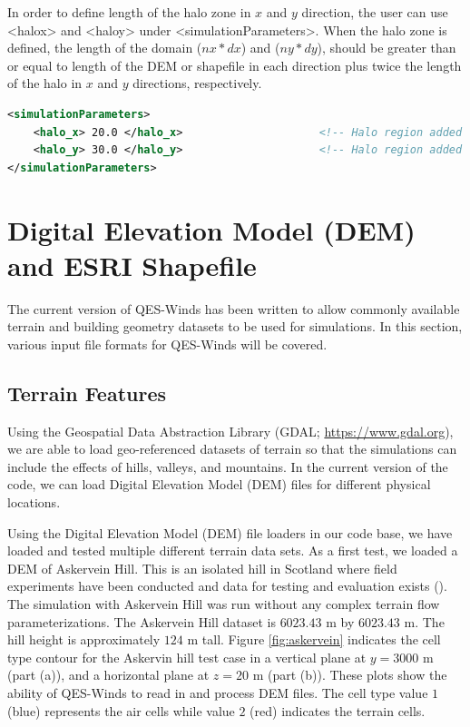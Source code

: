 In order to define length of the halo zone in $x$ and $y$ direction, the user can use <halo\textunderscore x> and <halo\textunderscore y> under <simulationParameters>. When the halo zone is defined, the length of the domain ($nx*dx$) and ($ny*dy$), should be greater than or equal to length of the DEM or shapefile in each direction plus twice the length of the halo in $x$ and $y$ directions, respectively.

\begin{lstlisting}[language=XML]
<simulationParameters>
  	<halo_x> 20.0 </halo_x>						<!-- Halo region added to x-direction of domain (at the beginning and the end of domain) (meters)-->
  	<halo_y> 30.0 </halo_y>						<!-- Halo region added to y-direction of domain (at the beginning and the end of domain) (meters)-->
</simulationParameters>
\end{lstlisting}

\section{Digital Elevation Model (DEM) and ESRI Shapefile}

The current version of QES-Winds has been written to allow commonly available terrain and building geometry datasets to be used for simulations. In this section, various input file formats for QES-Winds will be covered.

\subsection{Terrain Features}

Using the Geospatial Data Abstraction Library (GDAL; \href{https://www.gdal.org}{https://www.gdal.org}), we are able to load geo-referenced datasets of terrain so that the simulations can include the effects of hills, valleys, and mountains. In the current version of the code, we can load Digital Elevation Model (DEM) files for different physical locations.

Using the Digital Elevation Model (DEM) file loaders in our code base, we have loaded and tested multiple different terrain data sets. As a first test, we loaded a DEM of Askervein Hill. This is an isolated hill in Scotland where field experiments have been conducted and data for testing and evaluation exists (\cite{taylor1987askervein,mickle1988askervein}). The simulation with Askervein Hill was run without any complex terrain flow parameterizations. The Askervein Hill dataset is $6023.43$ m by $6023.43$ m. The hill height is approximately $124$ m tall. Figure \ref{fig:askervein} indicates the cell type contour for the Askervin hill test case in a vertical plane at $y = 3000$ m (part (a)), and a horizontal plane at $z=20$ m (part (b)). These plots show the ability of QES-Winds to read in and process DEM files. The cell type value $1$ (blue) represents the air cells while value $2$ (red) indicates the terrain cells.

